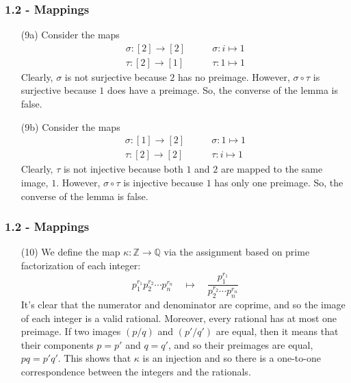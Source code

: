 \documentclass{beamer}
\begin{document}
\begin{frame}
\frametitle{1.2 - Mappings}
\small
\begin{enumerate}
	\item[(9a)] Consider the maps 
	\begin{align*}	
	\sigma: [2]\to [2]\quad &\quad \sigma: i\mapsto 1 \\
	\tau: [2]\to [1]\quad &\quad \tau: 1\mapsto 1
	\end{align*}
	Clearly, $\sigma$ is not surjective because $2$ has no preimage. However, $\sigma\circ\tau$ is surjective because $1$ does have a preimage. So, the converse of the lemma is false.
	\item[(9b)] Consider the maps
	\begin{align*}
	\sigma: [1]\to [2]\quad &\quad \sigma: 1\mapsto 1 \\
	\tau: [2]\to [2]\quad &\quad \tau: i\mapsto 1
	\end{align*}
	Clearly, $\tau$ is not injective because both $1$ and $2$ are mapped to the same image, $1$. However, $\sigma\circ\tau$ is injective because $1$ has only one preimage. So, the converse of the lemma is false.
\end{enumerate}
\end{frame}
\begin{frame}
\frametitle{1.2 - Mappings}
\small
\begin{enumerate}
	\item[(10)] We define the map $\kappa: \mathbb Z \to \mathbb Q$ via the assignment based on prime factorization of each integer:
	\begin{equation*}
	p_1^{r_1} p_2^{r_2}\cdots p_n^{r_n}\quad\mapsto\quad \frac{p_1^{r_1}}{p_2^{r_2}\cdots p_n^{r_n}}
	\end{equation*}
	It's clear that the numerator and denominator are coprime, and so the image of each integer is a valid rational. Moreover, every rational has at most one preimage. If two images $(p/q)$ and $(p'/q')$ are equal, then it means that their components $p=p'$ and $q=q'$, and so their preimages are equal, $pq = p'q'$. This shows that $\kappa$ is an injection and so there is a one-to-one correspondence between the integers and the rationals.
\end{enumerate}
\end{frame}
\end{document}
